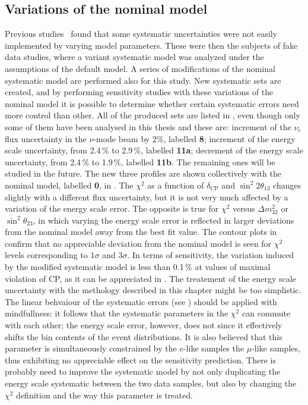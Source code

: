 \subsection{Variations of the nominal model}
\label{sec:variations}


Previous studies~\cite{Abe:2018wpn} found that some systematic uncertainties %
were not easily implemented by varying model parameters.
These were then the subjects of fake data studies, where a variant systematic model was analyzed under %
the assumptions of the default model.
A series of modifications of the nominal systematic model are performed also for this study.
New systematic sets are created, and by performing sensitivity studies with these variations of the nominal model %
it is possible to determine whether certain systematic errors need more control than other.
All of the produced sets are listed in , even though only %
some of them have been analysed in this thesis and these are:
increment of the $\nu_e$ flux uncertainty in the $\nu$-mode beam by 2\%, labelled \textbf{8}; %
increment of the energy scale uncertainty, from 2.4\,\% to 2.9\,\%, labelled \textbf{11a}; %
decrement of the energy scale uncertainty, from 2.4\,\% to 1.9\,\%, labelled \textbf{11b}.
The remaining ones will be studied in the future.
The new three profiles are shown collectively with the nominal model, labelled \textbf{0}, in .
The $\chi^2$ as a function of $\delta_\text{CP}$ and $\sin^2 2\theta_{13}$ changes slightly with a different flux uncertainty, %
but it is not very much affected by a variation of the energy scale error.
The opposite is true for $\chi^2$ versus $\Delta m_{32}^2$ or $\sin^2\theta_{23}$, in which %
varying the energy scale error is reflected in larger deviations from the nominal model away from the best fit value.
The contour plots in  confirm that no appreciable deviation from the nominal model %
is seen for $\chi^2$ levels corresponding to $1\sigma$ and $3\sigma$.
In terms of sensitivity, the variation induced by the modified systematic model is %
less than 0.1\,\% at values of maximal violation of CP, as it can be appreciated in .
The treatement of the energy scale uncertainty with the methology described in this chapter might be too simplistic.
The linear behvaiour of the systematic errors (see ) should be applied with mindfullness: %
it follows that the systematic parameters in the $\chi^2$ can commute with each other; %
the energy scale error, however, does not since it effectively shifts the bin contents of the event distributions.
It is also believed that this parameter is simultaneously constrained by the $e$-like samples %
the $\mu$-like samples, thus exhibiting no appreciable effect on the sensitivity prediction.
There is probably need to improve the systematic model by not only duplicating the energy scale systematic %
between the two data samples, but also by changing the $\chi^2$ definition and the way this parameter is treated.


